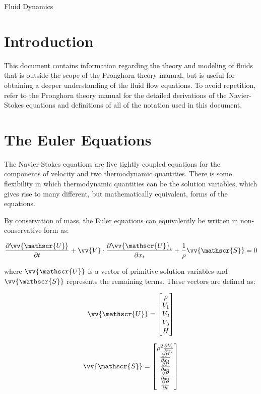 \documentclass[10pt]{article}
\newcommand{\beq}{\begin{equation}}
\newcommand{\eeq}{\end{equation}}
\begin{document}
\begin{centering}
\large Fluid Dynamics\\
\end{centering}

\tableofcontents
\clearpage

\section{Introduction}
\begin{flushleft}\justify

This document contains information regarding the theory and modeling of fluids that is outside the scope of the Pronghorn theory manual, but is useful for obtaining a deeper understanding of the fluid flow equations. To avoid repetition, refer to the Pronghorn theory manual for the detailed derivations of the Navier-Stokes equations and definitions of all of the notation used in this document.

\section{The Euler Equations}

The Navier-Stokes equations are five tightly coupled equations for the components of velocity and two thermodynamic quantities. There is some flexibility in which thermodynamic quantities can be the solution variables, which gives rise to many different, but mathematically equivalent, forms of the equations. 

By conservation of mass, the Euler equations can equivalently be written in non-conservative form as:

\beq
\frac{\partial\vv{\mathscr{U}}}{\partial t}+\vv{V}\cdot\frac{\partial\vv{\mathscr{U}}_i}{\partial x_i}+\frac{1}{\rho}\vv{\mathscr{S}}=0
\eeq

where \(\vv{\mathscr{U}}\) is a vector of primitive solution variables and \(\vv{\mathscr{S}}\) represents the remaining terms. These vectors are defined as:

\beq
\vv{\mathscr{U}}=\begin{bmatrix}\rho\\ V_1\\V_2\\V_3\\H\end{bmatrix}
\eeq

\beq
\vv{\mathscr{S}}=\begin{bmatrix}\rho^2\frac{\partial V_i}{\partial x_i}\\\frac{\partial P}{\partial x_1}\\\frac{\partial P}{\partial x_2}\\\frac{\partial P}{\partial x_3}\\\frac{\partial P}{\partial t}\end{bmatrix}
\eeq


\end{flushleft}
\end{document}
